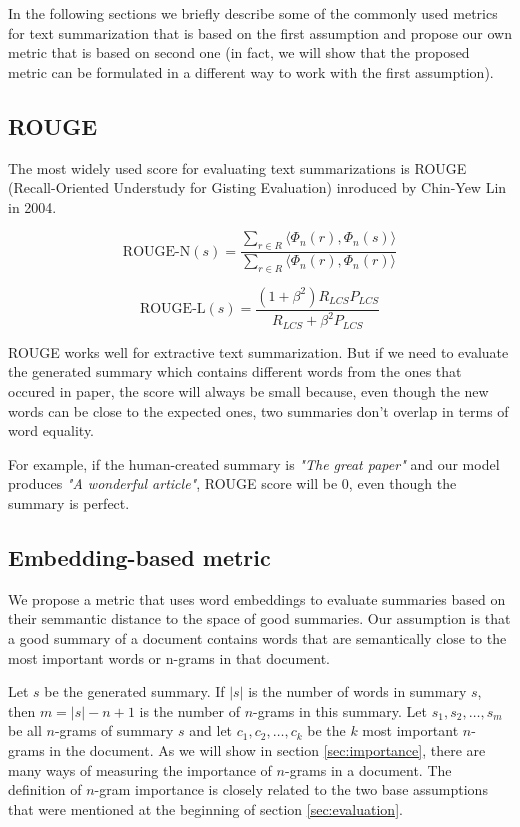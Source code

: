 \documentclass[sigplan]{acmart}
\begin{document}
In the following sections we briefly describe some of the commonly used metrics for text summarization that is based on the first assumption and propose our own metric that is based on second one (in fact, we will show that the proposed metric can be formulated in a different way to work with the first assumption).

\subsection{ROUGE}

The most widely used score for evaluating text summarizations is ROUGE (Recall-Oriented Understudy for Gisting Evaluation) inroduced by Chin-Yew Lin in 2004\cite{lin-4}\cite{kishore-2}.

\[ \text{ROUGE-N}(s) = \frac{\sum_{r \in R} \langle \Phi_n(r), \Phi_n(s) \rangle}{\sum_{r \in R} \langle \Phi_n(r), \Phi_n(r) \rangle} \]

\[ \text{ROUGE-L}(s) = \frac{(1 + \beta^2) R_{LCS} P_{LCS}}{R_{LCS} + \beta^2 P_{LCS}} \]

ROUGE works well for extractive text summarization. But if we need to evaluate the generated summary which contains different words from the ones that occured in paper, the score will always be small because, even though the new words can be close to the expected ones, two summaries don't overlap in terms of word equality.

For example, if the human-created summary is \textit{"The great paper"} and our model produces \textit{"A wonderful article"}, ROUGE score will be $0$, even though the summary is perfect.

\subsection{Embedding-based metric}

We propose a metric that uses word embeddings to evaluate summaries based on their semmantic distance to the space of good summaries. Our assumption is that a good summary of a document contains words that are semantically close to the most important words or n-grams in that document.

Let $s$ be the generated summary. If $|s|$ is the number of words in summary $s$, then $m=|s|-n+1$ is the number of $n$-grams in this summary. Let $s_1, s_2, \dots, s_m$ be all $n$-grams of summary $s$ and let $c_1, c_2, \dots, c_k$ be the $k$ most important $n$-grams in the document. As we will show in section \ref{sec:importance}, there are many ways of measuring the importance of $n$-grams in a document. The definition of $n$-gram importance is closely related to the two base assumptions that were mentioned at the beginning of section \ref{sec:evaluation}.
\end{document}
